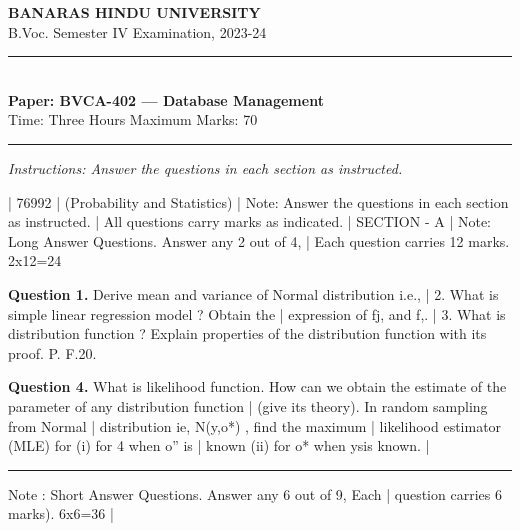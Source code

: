\documentclass[11pt,a4paper]{article}
\begin{document}
\begin{center}
  {\large\bfseries BANARAS HINDU UNIVERSITY}\\[2pt]
  {\normalsize B.Voc. Semester IV Examination, 2023-24}\\[6pt]
  \rule{0.8\linewidth}{0.5pt}\\[6pt]
  {\large\bfseries Paper: BVCA-402 --- Database Management}\\[4pt]
  {\normalsize Time: Three Hours \hfill Maximum Marks: 70}
\end{center}

\rule{\linewidth}{0.4pt}

\smallskip
\noindent\textit{Instructions: Answer the questions in each section as instructed.}

\bigskip

| 76992
| (Probability and Statistics)
| Note: Answer the questions in each section as instructed.
| All questions carry marks as indicated.
| SECTION - A
| Note: Long Answer Questions. Answer any 2 out of 4,
| Each question carries 12 marks. 2x12=24

\medskip\noindent\textbf{Question 1.} Derive mean and variance of Normal distribution i.e.,
| 2. What is simple linear regression model ? Obtain the
| expression of fj, and f,.
| 3. What is distribution function ? Explain properties of
the distribution function with its proof.
P. F.20.

\medskip\noindent\textbf{Question 4.} What is likelihood function. How can we obtain the
estimate of the parameter of any distribution function |
(give its theory). In random sampling from Normal |
distribution ie, N(y,o*) , find the maximum |
likelihood estimator (MLE) for (i) for 4 when o” is |
known (ii) for o* when ysis known. |

\bigskip{}
\rule{\linewidth}{0.4pt}\smallskip

Note : Short Answer Questions. Answer any 6 out of 9, Each |
question carries 6 marks). 6x6=36 |
\end{document}
